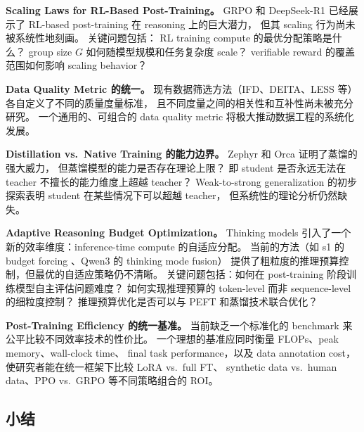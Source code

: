 \begin{openproblembox}
\textbf{Scaling Laws for RL-Based Post-Training。}
GRPO 和 DeepSeek-R1 已经展示了 RL-based post-training 在 reasoning 上的巨大潜力，
但其 scaling 行为尚未被系统性地刻画。
关键问题包括：
RL training compute 的最优分配策略是什么？
group size $G$ 如何随模型规模和任务复杂度 scale？
verifiable reward 的覆盖范围如何影响 scaling behavior？
\end{openproblembox}

\begin{openproblembox}
\textbf{Data Quality Metric 的统一。}
现有数据筛选方法（IFD、DEITA、LESS 等）各自定义了不同的质量度量标准，
且不同度量之间的相关性和互补性尚未被充分研究。
一个通用的、可组合的 data quality metric 将极大推动数据工程的系统化发展。
\end{openproblembox}

\begin{openproblembox}
\textbf{Distillation vs.\ Native Training 的能力边界。}
Zephyr 和 Orca 证明了蒸馏的强大威力，
但蒸馏模型的能力是否存在理论上限？
即 student 是否永远无法在 teacher 不擅长的能力维度上超越 teacher？
Weak-to-strong generalization \cite{burns2023weak} 的初步探索表明
student 在某些情况下可以超越 teacher，
但系统性的理论分析仍然缺失。
\end{openproblembox}

\begin{openproblembox}
\textbf{Adaptive Reasoning Budget Optimization。}
Thinking models 引入了一个新的效率维度：inference-time compute 的自适应分配。
当前的方法（如 s1 的 budget forcing \cite{muennighoff2025s1}、Qwen3 的 thinking mode fusion）
提供了粗粒度的推理预算控制，但最优的自适应策略仍不清晰。
关键问题包括：如何在 post-training 阶段训练模型自主评估问题难度？
如何实现推理预算的 token-level 而非 sequence-level 的细粒度控制？
推理预算优化是否可以与 PEFT 和蒸馏技术联合优化？
\end{openproblembox}

\begin{openproblembox}
\textbf{Post-Training Efficiency 的统一基准。}
当前缺乏一个标准化的 benchmark 来公平比较不同效率技术的性价比。
一个理想的基准应同时衡量 FLOPs、peak memory、wall-clock time、
final task performance，以及 data annotation cost，
使研究者能在统一框架下比较 LoRA vs.\ full FT、
synthetic data vs.\ human data、PPO vs.\ GRPO 等不同策略组合的 ROI。
\end{openproblembox}

\subsection{小结}

